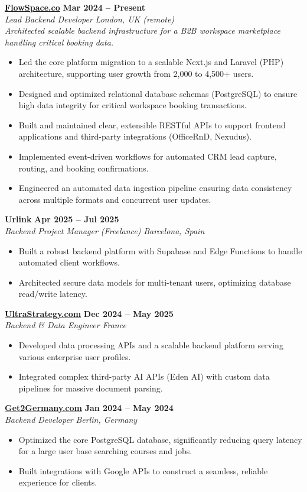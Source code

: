 \documentclass[a4paper,10pt]{article}
\newcommand{\role}[4]{%
 \textbf{#1} \hfill \textbf{#2}\\[1pt]%
 \textit{#3} \hfill \textit{#4}\\[2pt]%
}
\begin{document}
\role{\href{https://flowspace.co}{FlowSpace.co}}{Mar 2024 -- Present}{Lead Backend Developer}{London, UK (remote)}
\textit{Architected scalable backend infrastructure for a B2B workspace marketplace handling critical booking data.}
\begin{itemize}
 \item Led the core platform migration to a scalable Next.js and Laravel (PHP) architecture, supporting user growth from 2,000 to 4,500+ users.
 \item Designed and optimized relational database schemas (PostgreSQL) to ensure high data integrity for critical workspace booking transactions.
 \item Built and maintained clear, extensible RESTful APIs to support frontend applications and third-party integrations (OfficeRnD, Nexudus).
 \item Implemented event-driven workflows for automated CRM lead capture, routing, and booking confirmations.
 \item Engineered an automated data ingestion pipeline ensuring data consistency across multiple formats and concurrent user updates.
\end{itemize}

\role{Urlink}{Apr 2025 -- Jul 2025}{Backend Project Manager (Freelance)}{Barcelona, Spain}
\begin{itemize}
 \item Built a robust backend platform with Supabase and Edge Functions to handle automated client workflows.
 \item Architected secure data models for multi-tenant users, optimizing database read/write latency.
\end{itemize}

\role{\href{https://ultrastrategy.com}{UltraStrategy.com}}{Dec 2024 -- May 2025}{Backend \& Data Engineer}{France}
\begin{itemize}
 \item Developed data processing APIs and a scalable backend platform serving various enterprise user profiles.
 \item Integrated complex third-party AI APIs (Eden AI) with custom data pipelines for massive document parsing.
\end{itemize}

\role{\href{https://get2germany.com}{Get2Germany.com}}{Jan 2024 -- May 2024}{Backend Developer}{Berlin, Germany}
\begin{itemize}
 \item Optimized the core PostgreSQL database, significantly reducing query latency for a large user base searching courses and jobs.
 \item Built integrations with Google APIs to construct a seamless, reliable experience for clients.
\end{itemize}
\end{document}
